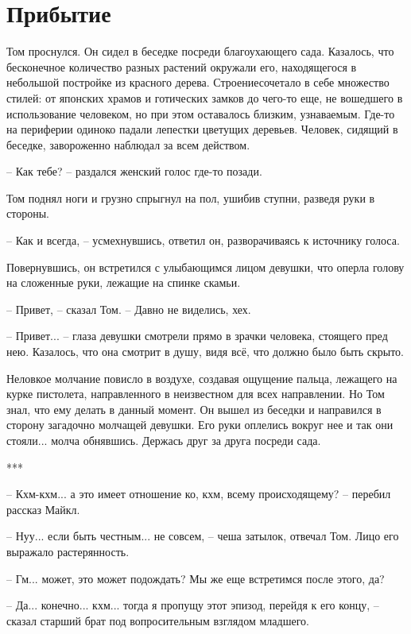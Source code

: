 \chapter{Прибытие}
\lettrine{Т}{}ом проснулся. Он сидел в беседке посреди благоухающего сада. Казалось, что бесконечное количество разных растений окружали его, находящегося в небольшой постройке из красного дерева. Строениесочетало в себе множество стилей: от японских храмов и готических замков до чего-то еще, не вошедшего в использование человеком, но при этом оставалось близким, узнаваемым. Где-то на периферии одиноко падали лепестки цветущих деревьев. Человек, сидящий в беседке, завороженно наблюдал за всем действом. 

– Как тебе? – раздался женский голос где-то позади.

Том поднял ноги и грузно спрыгнул на пол, ушибив ступни, разведя руки в стороны. 

– Как и всегда, – усмехнувшись, ответил он, разворачиваясь к источнику голоса.  

Повернувшись, он встретился с улыбающимся лицом девушки, что оперла голову на сложенные руки, лежащие на спинке скамьи. 

– Привет, – сказал Том. – Давно не виделись, хех. 

– Привет... – глаза девушки смотрели прямо в зрачки человека, стоящего пред нею. Казалось, что она смотрит в душу, видя всё, что должно было быть скрыто. 

Неловкое молчание повисло в воздухе, создавая ощущение пальца, лежащего на курке пистолета, направленного в неизвестном для всех направлении. Но Том знал, что ему делать в данный момент. Он вышел из беседки и направился в сторону загадочно молчащей девушки. Его руки оплелись вокруг нее и так они стояли... молча обнявшись. Держась друг за друга посреди сада.

\begin{center}***\end{center}

– Кхм-кхм... а это имеет отношение ко, кхм, всему происходящему? – перебил рассказ Майкл. 

– Нуу... если быть честным... не совсем, – чеша затылок, отвечал Том. Лицо его выражало растерянность.

– Гм... может, это может подождать? Мы же еще встретимся после этого, да?

– Да... конечно... кхм... тогда я пропущу этот эпизод, перейдя к его концу, – сказал старший брат под вопросительным взглядом младшего.

